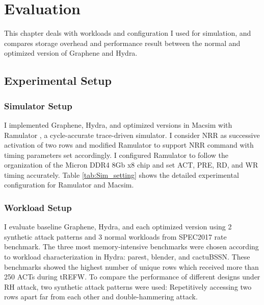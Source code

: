 \chapter{Evaluation} \label{sec:Evaluation}

This chapter deals with workloads and configuration I used for simulation, and compares storage overhead and performance result
between the normal and optimized version of Graphene and Hydra. 
\section{Experimental Setup} \label{sec:exp-setup}
\subsection{Simulator Setup}
\label{sec:simulator-setup}

I implemented Graphene, Hydra, and optimized versions in Macsim \cite{MACSIM} with Ramulator \cite{RAMULATOR}, 
a cycle-accurate trace-driven simulator. I consider NRR as successive activation of two rows and modified Ramulator 
to support NRR command with timing parameters set accordingly. 
I configured Ramulator to follow the organization of the Micron DDR4 8Gb x8 chip and set ACT, PRE, RD, and WR timing accurately. 
Table \ref{tab:Sim_setting} shows the detailed experimental configuration for Ramulator and Macsim. 

\subsection{Workload Setup}
\label{sec:workload-setup}
I evaluate baseline Graphene, Hydra, and each optimized version using 2 synthetic attack patterns and 3 normal workloads from
SPEC2017 rate benchmark\cite{SPEC2017}. The three most memory-intensive benchmarks were chosen according to workload 
characterization in Hydra: parest, blender, and cactuBSSN. These benchmarks showed the highest number of 
unique rows which received more than 250 ACTs during tREFW. To compare the performance of different designs under RH attack, 
two synthetic attack patterns were used: Repetitively accessing two rows apart far from each other and double-hammering attack. 

